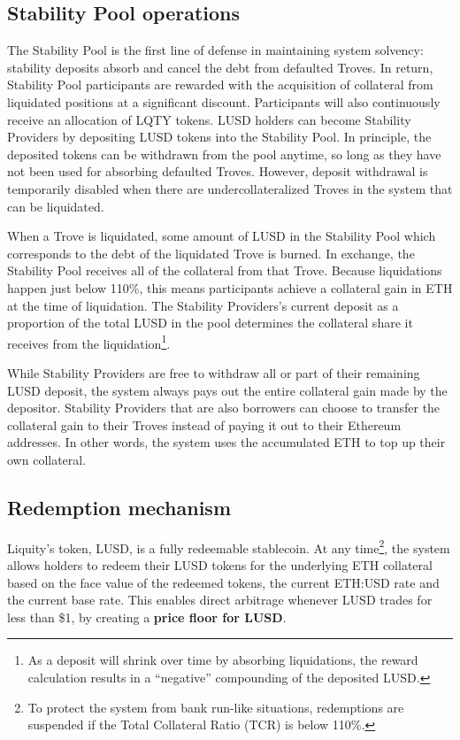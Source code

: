 \documentclass{article}
\begin{document}
\subsection{Stability Pool operations}
The Stability Pool is the first line of defense in maintaining system solvency: stability deposits absorb and cancel the debt from defaulted Troves. In return, Stability Pool participants are rewarded with the acquisition of collateral from liquidated positions at a significant discount. Participants will also continuously receive an allocation of LQTY tokens.
LUSD holders can become Stability Providers by depositing LUSD tokens into the Stability Pool. In principle, the deposited tokens can be withdrawn from the pool anytime, so long as they have not been used for absorbing defaulted Troves. However, deposit withdrawal is temporarily disabled when there are undercollateralized Troves in the system that can be liquidated.

When a Trove is liquidated, some amount of LUSD in the Stability Pool which corresponds to the debt of the liquidated Trove is burned. In exchange, the Stability Pool receives all of the collateral from that Trove. Because liquidations happen just below 110\%, this means participants achieve a collateral gain in ETH at the time of liquidation. The Stability Providers’s current deposit as a proportion of the total LUSD in the pool determines the collateral share it receives from the liquidation\footnote{As a deposit will shrink over time by absorbing liquidations, the reward calculation results in a “negative” compounding of the deposited LUSD.}. 

While Stability Providers are free to withdraw all or part of their remaining LUSD deposit, the system always pays out the entire collateral gain made by the depositor. Stability Providers that are also borrowers can choose to transfer the collateral gain to their Troves instead of paying it out to their Ethereum addresses. In other words, the system uses the accumulated ETH to top up their own collateral. 

\subsection{Redemption mechanism}
Liquity’s token, LUSD, is a fully redeemable stablecoin. At any time\footnote{To protect the system from bank run-like situations, redemptions are suspended if the Total Collateral Ratio (TCR) is below 110\%.}, the system allows holders to redeem their LUSD tokens for the underlying ETH collateral based on the face value of the redeemed tokens, the current ETH:USD rate and the current base rate. This enables direct arbitrage whenever LUSD trades for less than \$1, by creating a \textbf{price floor for LUSD}.\\
\end{document}
